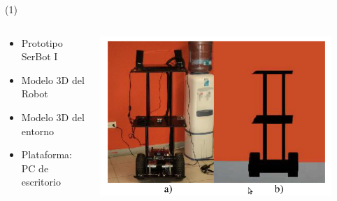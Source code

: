 \begin{frame}{ \footnotemark (1)}
\begin{columns}
\begin{column}{0.52\textwidth}
    \begin{center}

\begin{itemize}
\item Prototipo SerBot I
\item Modelo 3D del Robot
\item Modelo 3D del entorno
\item Plataforma: PC de escritorio
\end{itemize}
     \end{center}

\end{column}
\begin{column}{0.48\textwidth}  
    \begin{center}
\begin{itemize}
\end{itemize}
     \includegraphics[width=0.9\textwidth]{Figs/SerbotI_A}\\
     \end{center}
\end{column}
\end{columns}


\end{frame}



